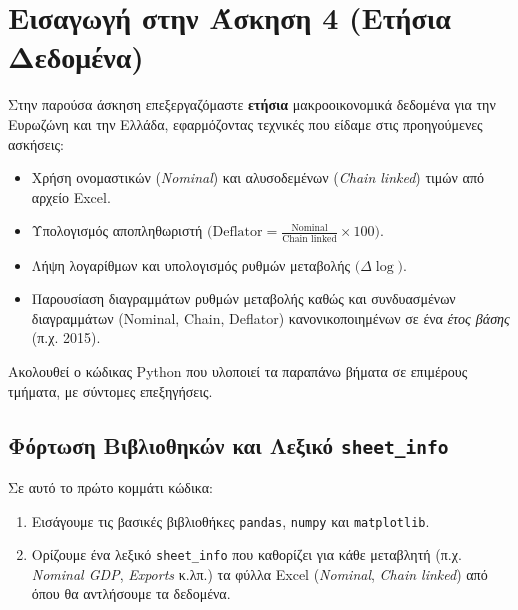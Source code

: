 \documentclass{book}
\begin{document}
\chapter{Εισαγωγή στην Άσκηση 4 (Ετήσια Δεδομένα)}
Στην παρούσα άσκηση επεξεργαζόμαστε \textbf{ετήσια} μακροοικονομικά δεδομένα για την Ευρωζώνη και την Ελλάδα, εφαρμόζοντας τεχνικές που είδαμε στις προηγούμενες ασκήσεις:
\begin{itemize}
    \item Χρήση ονομαστικών (\emph{Nominal}) και αλυσοδεμένων (\emph{Chain linked}) τιμών από αρχείο Excel.
    \item Υπολογισμός αποπληθωριστή \(\bigl(\text{Deflator} = \frac{\text{Nominal}}{\text{Chain linked}}\times 100\bigr)\).
    \item Λήψη λογαρίθμων και υπολογισμός ρυθμών μεταβολής \(\bigl(\Delta \log\bigr)\).
    \item Παρουσίαση διαγραμμάτων ρυθμών μεταβολής καθώς και συνδυασμένων διαγραμμάτων (Nominal, Chain, Deflator) κανονικοποιημένων σε ένα \emph{έτος βάσης} (π.χ. 2015).
\end{itemize}

Ακολουθεί ο κώδικας Python που υλοποιεί τα παραπάνω βήματα σε επιμέρους τμήματα, με σύντομες επεξηγήσεις.


\section{Φόρτωση Βιβλιοθηκών και Λεξικό \texttt{sheet\_info}}
Σε αυτό το πρώτο κομμάτι κώδικα:
\begin{enumerate}
    \item Εισάγουμε τις βασικές βιβλιοθήκες \texttt{pandas}, \texttt{numpy} και \texttt{matplotlib}.
    \item Ορίζουμε ένα λεξικό \texttt{sheet\_info} που καθορίζει για κάθε μεταβλητή (π.χ. \emph{Nominal GDP}, \emph{Exports} κ.λπ.) τα φύλλα Excel (\emph{Nominal}, \emph{Chain linked}) από όπου θα αντλήσουμε τα δεδομένα.
\end{enumerate}
\end{document}
